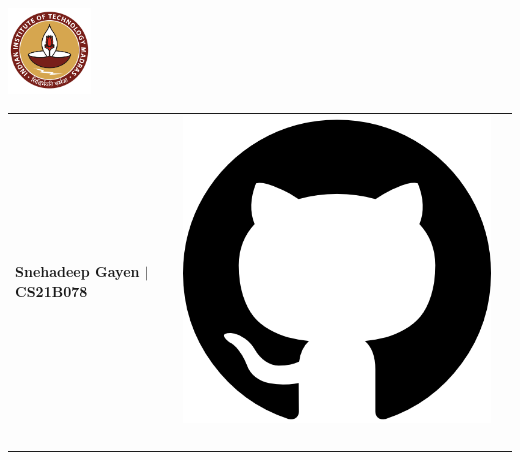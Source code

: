 \documentclass[10pt,article]{article}
\begin{document}
\vspace{-0.1cm}
\begin{table}
    \begin{minipage}{0\linewidth}
        \centering
        \includegraphics[height=0.9in]{Logo.png}
    \end{minipage}
    \begin{minipage}{0.9\linewidth}
        \setlength{\tabcolsep}{70pt}
        \def\arraystretch{1.1}
        \begin{tabular}{l l r}
            \textbf{\Large{Snehadeep Gayen $\vert$ CS21B078}} &
            \multirow{3}{*}{     {\href{https://github.com/Snehadeep-Gayen}{\includegraphics[scale=0.05]{github.png}} \ 
}}
\end{tabular}
\end{minipage}
\end{table}
\end{document}
